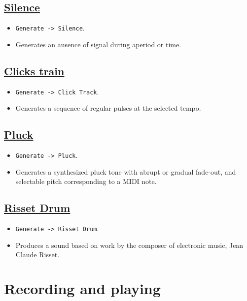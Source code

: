 \section{\href{http://manual.audacityteam.org/o/man/generate_menu.html\#silence}{Silence}}
\begin{itemize}
\item \verb|Generate -> Silence|.
\item Generates an ausence of signal during aperiod or time.
\end{itemize}

\section{\href{http://manual.audacityteam.org/o/man/click_track.html}{Clicks train}}
\begin{itemize}
\item \verb|Generate -> Click Track|.
\item Generates a sequence of regular pulses at the selected tempo.
\end{itemize}

\section{\href{http://manual.audacityteam.org/o/man/pluck.html}{Pluck}}
\begin{itemize}
\item \verb|Generate -> Pluck|.
\item Generates a synthesized pluck tone with abrupt or gradual
  fade-out, and selectable pitch corresponding to a MIDI note.
\end{itemize}

\section{\href{http://manual.audacityteam.org/o/man/risset_drum.html}{Risset Drum}}
\begin{itemize}
\item \verb|Generate -> Risset Drum|.
\item Produces a sound based on work by the composer of electronic
  music, Jean Claude Risset.
\end{itemize}

\chapter{Recording and playing}


